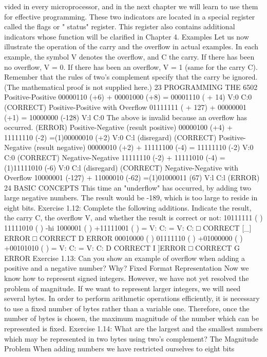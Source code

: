 vided in every microprocessor, and in the next chapter we will
learn to use them for effective programming. These two indicators
are located in a special register called the flags or " status"
register. This register also contains additional indicators whose
function will be clarified in Chapter 4.
Examples
Let us now illustrate the operation of the carry and the overflow
in actual examples. In each example, the symbol V denotes the
overflow, and C the carry.
If there has been no overflow, V = 0. If there has been an
overflow, V = 1 (same for the carry C). Remember that the rules of
two's complement specify that the carry be ignored. (The
mathematical proof is not supplied here.)
23
PROGRAMMING THE 6502
Positive-Positive
00000110 (+6)
+ 00001000 (+8)
= 00001110 ( + 14) V:0 C:0
(CORRECT)
Positive-Positive with Overflow
01111111 ( + 127)
+ 00000001 (+1)
= 10000000 (-128) V:l C:0
The above is invalid because an overflow has occurred.
(ERROR)
Positive-Negative (result positive)
00000100 (+4)
+ 11111110 (-2)
=(1)00000010 (+2) V:0 C:l (disregard)
(CORRECT)
Positive-Negative (result negative)
00000010 (+2)
+ 11111100 (-4)
= 11111110 (-2) V:0 C:0
(CORRECT)
Negative-Negative
11111110 (-2)
+ 11111010 (-4)
=(1)11111010 (-6) V:0 C:l (disregard)
(CORRECT)
Negative-Negative with Overflow
10000001 (-127)
+ 11000010 (-62)
=(1)01000011 (67) V:l C:l
(ERROR)
24
BASIC CONCEPTS
This time an "underflow" has occurred, by adding two large
negative numbers. The result would be -189, which is too large to
reside in eight bits.
Exercise 1.12: Complete the following additions. Indicate the
result, the carry C, the overflow V, and whether the result is correct
or not:
10111111 ( ) 11111010 ( )
-hi 1000001 ( ) +11111001 ( )
= V: C: = V: C:
□ CORRECT [_] ERROR □ CORRECT D ERROR
00010000 ( ) 01111110 ( )
+01000000 ( ) +00101010 ( )
= V: C: = V: C:
D CORRECT I ]ERROR □ CORRECT G ERROR
Exercise 1.13: Can you show an example of overflow when adding a
positive and a negative number? Why?
Fixed Format Representation
Now we know how to represent signed integers. However, we
have not yet resolved the problem of magnitude. If we want to
represent larger integers, we will need several bytes. In order to
perform arithmetic operations efficiently, it is necessary to use a
fixed number of bytes rather than a variable one. Therefore, once
the number of bytes is chosen, the maximum magnitude of the
number which can be represented is fixed.
Exercise 1.14: What are the largest and the smallest numbers
which may be represented in two bytes using two's complement?
The Magnitude Problem
When adding numbers we have restricted ourselves to eight bits
